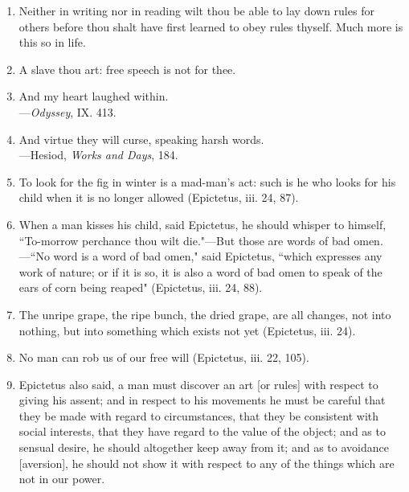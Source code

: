 \begin{enumerate}
\item Neither in writing nor in reading wilt thou be able to lay down rules for others before thou shalt have first learned to obey rules thyself. Much more is this so in life.

\item
\begin{displayquote}
	\hspace{-1.9em} A slave thou art: free speech is not for thee.
\end{displayquote}
\item
\begin{displayquote}
	\hspace{-1.9em}And my heart laughed within.	\\
	—\textit{Odyssey}, IX. 413.
\end{displayquote}
\item
\begin{displayquote}
	\hspace{-1.9em}And virtue they will curse, speaking harsh words.\\
				—Hesiod, \textit{Works and Days}, 184.
\end{displayquote}

\item To look for the fig in winter is a mad-man's act: such is he who looks for his child when it is no longer allowed (Epictetus, iii. 24, 87).

\item When a man kisses his child, said Epictetus, he should whisper to himself, ``To-morrow perchance thou wilt die."—But those are words of bad omen.—``No word is a word of bad omen," said Epictetus, ``which expresses any work of nature; or if it is so, it is also a word of bad omen to speak of the ears of corn being reaped" (Epictetus, iii. 24, 88).

\item The unripe grape, the ripe bunch, the dried grape, are all changes, not into nothing, but into something which exists not yet (Epictetus, iii. 24).

\item No man can rob us of our free will (Epictetus, iii. 22, 105).

\item Epictetus also said, a man must discover an art [{\clarify or rules}] with respect to giving his assent; and in respect to his movements he must be careful that they be made with regard to circumstances, that they be consistent with social interests, that they have regard to the value of the object; and as to sensual desire, he should altogether keep away from it; and as to avoidance [{\clarify aversion}], he should not show it with respect to any of the things which are not in our power.


\end{enumerate}

